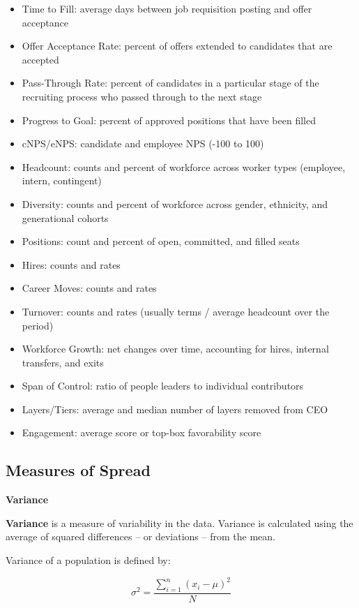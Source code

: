 \documentclass[
]{book}
\providecommand{\tightlist}{%
  \setlength{\itemsep}{0pt}\setlength{\parskip}{0pt}}
\begin{document}
\begin{itemize}
\tightlist
\item
  Time to Fill: average days between job requisition posting and offer acceptance
\item
  Offer Acceptance Rate: percent of offers extended to candidates that are accepted
\item
  Pass-Through Rate: percent of candidates in a particular stage of the recruiting process who passed through to the next stage
\item
  Progress to Goal: percent of approved positions that have been filled
\item
  cNPS/eNPS: candidate and employee NPS (-100 to 100)
\item
  Headcount: counts and percent of workforce across worker types (employee, intern, contingent)
\item
  Diversity: counts and percent of workforce across gender, ethnicity, and generational cohorts
\item
  Positions: count and percent of open, committed, and filled seats
\item
  Hires: counts and rates
\item
  Career Moves: counts and rates
\item
  Turnover: counts and rates (usually terms / average headcount over the period)
\item
  Workforce Growth: net changes over time, accounting for hires, internal transfers, and exits
\item
  Span of Control: ratio of people leaders to individual contributors
\item
  Layers/Tiers: average and median number of layers removed from CEO
\item
  Engagement: average score or top-box favorability score
\end{itemize}

\hypertarget{measures-of-spread}{%
\subsection{Measures of Spread}\label{measures-of-spread}}

\textbf{Variance}

\textbf{Variance} is a measure of variability in the data. Variance is calculated using the average of squared differences -- or deviations -- from the mean.

Variance of a population is defined by:

\[ \sigma^{2} = \frac{\displaystyle\sum_{i=1}^{n} (x_{i}-\mu)^{2}}{N} \]
\end{document}
